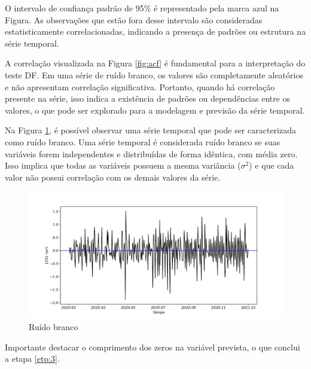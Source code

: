 O intervalo de confiança padrão de 95\% é representado pela marca azul na Figura. As observações que estão fora desse intervalo são consideradas estatisticamente correlacionadas, indicando a presença de padrões ou estrutura na série temporal.

A correlação visualizada na Figura \ref{fig:acf} é fundamental para a interpretação do teste DF. Em uma série de ruído branco, os valores são completamente aleatórios e não apresentam correlação significativa. Portanto, quando há correlação presente na série, isso indica a existência de padrões ou dependências entre os valores, o que pode ser explorado para a modelagem e previsão da série temporal.


Na Figura \ref{fig:ruido-branco}, é possível observar uma série temporal que pode ser caracterizada como ruído branco. Uma série temporal é considerada ruído branco se suas variáveis forem independentes e distribuídas de forma idêntica, com média zero. Isso implica que todas as variáveis possuem a mesma variância ($\sigma^2$) e que cada valor não possui correlação com os demais valores da série.

\begin{figure}[H]
	\centering
	\caption{Ruído branco}
	\label{fig:ruido-branco}
	\includegraphics[width=0.9\linewidth]{Resultados/Figuras/ruido-branco}
	

\end{figure}

Importante destacar o comprimento dos zeros na variável prevista, o que conclui a etapa \ref{etp:3}.
